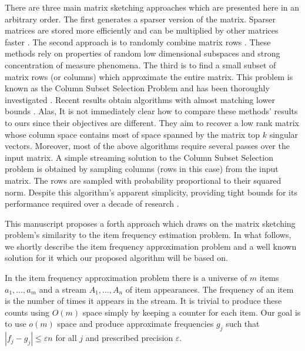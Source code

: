 \documentclass[]{article}
\newcommand{\eps}{\varepsilon}
\begin{document}
There are three main matrix sketching approaches which are presented here in an arbitrary order.
The first generates a sparser version of the matrix. 
Sparser matrices are stored more efficiently and can be multiplied by other matrices 
faster \cite{AroraHazanKale2006}\cite{AchlioptasMcsherry2007}.
The second approach is to randomly combine matrix rows  \cite{PapadimitriouTRV1998}\cite{Vempala2004}\cite{Sarlos06}\cite{tygert07PNAS}.
These methods rely on properties of random low dimensional subspaces and strong concentration of measure phenomena.
The third is to find a small subset of matrix rows (or columns) which approximate the entire matrix. 
This problem is known as the Column Subset Selection Problem and has been thoroughly investigated 
\cite{FriezeKannanVempala1998}\cite{Drineas03passefficient}\cite{BoutsidisMahoneyDrineas2009}\cite{DeshpandeV06}\cite{DrineasMohoneyMuthukrishnan2011}\cite{BoutsidisDrineasMagdon2011}. Recent results obtain algorithms with almost matching lower bounds \cite{DeshpandeV06}\cite{BoutsidisDrineasMagdon2011}\cite{ClarksonWoodruff2009}.
Alas, It is not immediately clear how to compare these methods' results to ours since their objectives are different.
They aim to recover a low rank matrix whose column space contains most of space spanned by the matrix top $k$ singular vectors.
Moreover, most of the above algorithms require several passes over the input matrix.
A simple streaming solution to the Column Subset Selection problem is obtained by sampling columns (rows in this case) from the input matrix.
The rows are sampled with probability proportional to their squared norm.
Despite this algorithm's apparent simplicity, providing tight bounds for its performance required over a decade of research \cite{FriezeKannanVempala1998}\cite{AhlswedeW02}\cite{DrineasKannan2003}\cite{RudelsonVershyninMatrixSampling2007}\cite{VershyninMatrixChernoffBounds}\cite{Oliviera2010}\cite{DrineasMohoneyMuthukrishnan2011}. 

This manuscript proposes a forth approach which draws on the matrix sketching problem's similarity to the item frequency estimation problem.
In what follows, we shortly describe the item frequency approximation problem and a well known solution for it
which our proposed algorithm will be based on. 


In the item frequency approximation problem there is a universe 
of $m$ items $a_1,\ldots,a_m$ and a stream $A_1,\dots,A_{n}$ of item appearances.
The frequency of an item is the number of times it appears in the stream.
It is trivial to produce these counts using $O(m)$ space simply by keeping a counter for each item.
Our goal is to use $o(m)$ space and produce approximate 
frequencies $g_j$ such that $ |f_j - g_j | \le \eps n$ for all $j$ and prescribed precision $\eps$.
\end{document}
